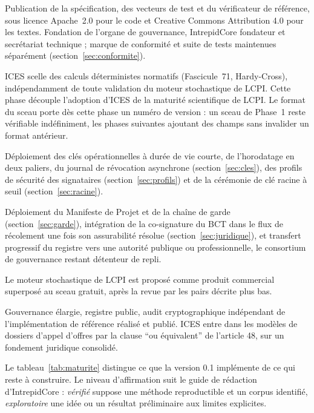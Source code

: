 \documentclass[11pt,a4paper]{article}
\begin{document}
\begin{description}[leftmargin=0pt,labelsep=0.6em]
  \item[Phase~0, standard bien public.] Publication de la spécification, des vecteurs de test et du vérificateur de référence, sous licence Apache~2.0 pour le code et Creative Commons Attribution 4.0 pour les textes. Fondation de l'organe de gouvernance, IntrepidCore fondateur et secrétariat technique ; marque de conformité et suite de tests maintenues séparément (section~\ref{sec:conformite}).
  \item[Phase~1, ingénierie conventionnelle.] ICES scelle des calculs déterministes normatifs (Fascicule~71, Hardy-Cross), indépendamment de toute validation du moteur stochastique de LCPI. Cette phase découple l'adoption d'ICES de la maturité scientifique de LCPI. Le format du sceau porte dès cette phase un numéro de version : un sceau de Phase~1 reste vérifiable indéfiniment, les phases suivantes ajoutant des champs sans invalider un format antérieur.
  \item[Phase~2, attribution.] Déploiement des clés opérationnelles à durée de vie courte, de l'horodatage en deux paliers, du journal de révocation asynchrone (section~\ref{sec:cles}), des profils de sécurité des signataires (section~\ref{sec:profils}) et de la cérémonie de clé racine à seuil (section~\ref{sec:racine}).
  \item[Phase~3, responsabilité et confiance publique.] Déploiement du Manifeste de Projet et de la chaîne de garde (section~\ref{sec:garde}), intégration de la co-signature du BCT dans le flux de récolement une fois son assurabilité résolue (section~\ref{sec:juridique}), et transfert progressif du registre vers une autorité publique ou professionnelle, le consortium de gouvernance restant détenteur de repli.
  \item[Phase~4, solveur commercial distinct.] Le moteur stochastique de LCPI est proposé comme produit commercial superposé au sceau gratuit, après la revue par les pairs décrite plus bas.
  \item[Phase~5, standard sectoriel.] Gouvernance élargie, registre public, audit cryptographique indépendant de l'implémentation de référence réalisé et publié. ICES entre dans les modèles de dossiers d'appel d'offres par la clause \enquote{ou équivalent} de l'article 48, sur un fondement juridique consolidé.
\end{description}

Le tableau~\ref{tab:maturite} distingue ce que la version 0.1 implémente de ce qui reste à construire. Le niveau d'affirmation suit le guide de rédaction d'IntrepidCore : \emph{vérifié} suppose une méthode reproductible et un corpus identifié, \emph{exploratoire} une idée ou un résultat préliminaire aux limites explicites.
\end{document}
